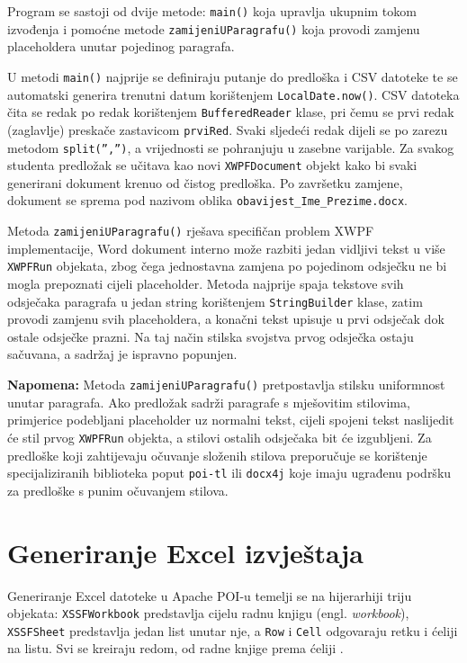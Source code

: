 \documentclass[]{foi}
\begin{document}
Program se sastoji od dvije metode: \texttt{main()} koja upravlja ukupnim tokom izvođenja i pomoćne metode \texttt{zamijeniUParagrafu()} koja provodi zamjenu placeholdera unutar pojedinog paragrafa.

U metodi \texttt{main()} najprije se definiraju putanje do predloška i CSV datoteke te se automatski generira trenutni datum korištenjem \texttt{LocalDate.now()}. CSV datoteka čita se redak po redak korištenjem \texttt{BufferedReader} klase, pri čemu se prvi redak (zaglavlje) preskače zastavicom \texttt{prviRed}. Svaki sljedeći redak dijeli se po zarezu metodom \texttt{split('','')}, a vrijednosti se pohranjuju u zasebne varijable. Za svakog studenta predložak se učitava kao novi \texttt{XWPFDocument} objekt kako bi svaki generirani dokument krenuo od čistog predloška. Po završetku zamjene, dokument se sprema pod nazivom oblika \texttt{obavijest\_Ime\_Prezime.docx}.

Metoda \texttt{zamijeniUParagrafu()} rješava specifičan problem XWPF implementacije, Word dokument interno može razbiti jedan vidljivi tekst u više \texttt{XWPFRun} objekata, zbog čega jednostavna zamjena po pojedinom odsječku ne bi mogla prepoznati cijeli placeholder. Metoda najprije spaja tekstove svih odsječaka paragrafa u jedan string korištenjem \texttt{StringBuilder} klase, zatim provodi zamjenu svih placeholdera, a konačni tekst upisuje u prvi odsječak dok ostale odsječke prazni. Na taj način stilska svojstva prvog odsječka ostaju sačuvana, a sadržaj je ispravno popunjen.

\begin{mdframed}
\textbf{Napomena:} Metoda \texttt{zamijeniUParagrafu()} pretpostavlja stilsku 
uniformnost unutar paragrafa. Ako predložak sadrži paragrafe s mješovitim 
stilovima, primjerice podebljani placeholder uz normalni tekst, cijeli 
spojeni tekst naslijedit će stil prvog \texttt{XWPFRun} objekta, a stilovi 
ostalih odsječaka bit će izgubljeni. Za predloške koji zahtijevaju očuvanje 
složenih stilova preporučuje se korištenje specijaliziranih biblioteka 
poput \texttt{poi-tl} ili \texttt{docx4j} koje imaju ugrađenu podršku za 
predloške s punim očuvanjem stilova.
\end{mdframed}

\section{Generiranje Excel izvještaja}

Generiranje Excel datoteke u Apache POI-u temelji se na hijerarhiji triju objekata: \texttt{XSSFWorkbook} predstavlja cijelu radnu knjigu (engl. \textit{workbook}), \texttt{XSSFSheet} predstavlja jedan list unutar nje, a \texttt{Row} i \texttt{Cell} odgovaraju retku i ćeliji na listu. Svi se kreiraju redom, od radne knjige prema ćeliji \cite{apachePOISpreadsheetQuickGuide}.
\end{document}
